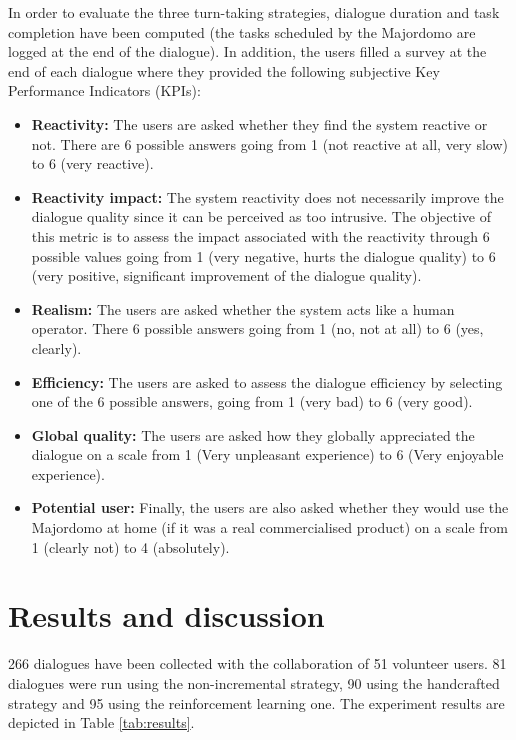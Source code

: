 		In order to evaluate the three turn-taking strategies, dialogue duration and task completion have been computed (the tasks scheduled by the Majordomo are logged at the end of the dialogue). In addition, the users filled a survey at the end of each dialogue where they provided the following subjective Key Performance Indicators (KPIs):
		
		\begin{itemize}
			\item \textbf{Reactivity:} The users are asked whether they find the system reactive or not. There are 6 possible answers going from 1 (not reactive at all, very slow) to 6 (very reactive).
			\item \textbf{Reactivity impact:} The system reactivity does not necessarily improve the dialogue quality since it can be perceived as too intrusive. The objective of this metric is to assess the impact associated with the reactivity through 6 possible values going from 1 (very negative, hurts the dialogue quality) to 6 (very positive, significant improvement of the dialogue quality).
			\item \textbf{Realism:} The users are asked whether the system acts like a human operator. There 6 possible answers going from 1 (no, not at all) to 6 (yes, clearly).
			\item \textbf{Efficiency:} The users are asked to assess the dialogue efficiency by selecting one of the 6 possible answers, going from 1 (very bad) to 6 (very good).
			\item \textbf{Global quality:} The users are asked how they globally appreciated the dialogue on a scale from 1 (Very unpleasant experience) to 6 (Very enjoyable experience).
			\item \textbf{Potential user:} Finally, the users are also asked whether they would use the Majordomo at home (if it was a real commercialised product) on a scale from 1 (clearly not) to 4 (absolutely).
		\end{itemize}


\section{Results and discussion}

	266 dialogues have been collected with the collaboration of 51 volunteer users. 81 dialogues were run using the non-incremental strategy, 90 using the handcrafted strategy and 95 using the reinforcement learning one. The experiment results are depicted in Table \ref{tab:results}.
	
